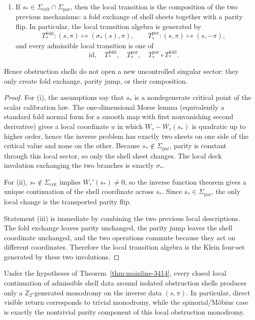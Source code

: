 \begin{theorem}
\begin{enumerate}[label=(\roman*)]
  \item If $s_\ast\in \Sigma_{\mathrm{crit}}\cap\Sigma_{\mathrm{par}}$, then the local transition is the composition of the two previous mechanisms: a fold exchange of shell sheets together with a parity flip. In particular, the local transition algebra is generated by
  \[
    T_\ast^{\mathrm{fold}}:(s,\pi)\mapsto (\sigma_\ast(s),\pi),
    \qquad
    T_\ast^{\mathrm{par}}:(s,\pi)\mapsto (s,-\pi),
  \]
  and every admissible local transition is one of
  \[
    \mathrm{id},
    \quad
    T_\ast^{\mathrm{fold}},
    \quad
    T_\ast^{\mathrm{par}},
    \quad
    T_\ast^{\mathrm{par}}\circ T_\ast^{\mathrm{fold}}.
  \]
\end{enumerate}
Hence obstruction shells do not open a new uncontrolled singular sector: they only create fold exchange, parity jump, or their composition.
\end{theorem}

\begin{proof}
For (i), the assumptions say that $s_\ast$ is a nondegenerate critical point of the scalar calibration law. The one-dimensional Morse lemma (equivalently a standard fold normal form for a smooth map with first nonvanishing second derivative) gives a local coordinate $u$ in which $W_\tau-W_\tau(s_\ast)$ is quadratic up to higher order, hence the inverse problem has exactly two sheets on one side of the critical value and none on the other. Because $s_\ast\notin \Sigma_{\mathrm{par}}$, parity is constant through this local sector, so only the shell sheet changes. The local deck involution exchanging the two branches is exactly $\sigma_\ast$.

For (ii), $s_\ast\notin \Sigma_{\mathrm{crit}}$ implies $W_\tau'(s_\ast)\neq 0$, so the inverse function theorem gives a unique continuation of the shell coordinate across $s_\ast$. Since $s_\ast\in \Sigma_{\mathrm{par}}$, the only local change is the transported parity flip.

Statement (iii) is immediate by combining the two previous local descriptions. The fold exchange leaves parity unchanged, the parity jump leaves the shell coordinate unchanged, and the two operations commute because they act on different coordinates. Therefore the local transition algebra is the Klein four-set generated by these two involutions.
\end{proof}

\begin{corollary}
\label{cor:mainline-3414}
Under the hypotheses of Theorem~\ref{thm:mainline-3414}, every closed local continuation of admissible shell data around isolated obstruction shells produces only a $\mathbb Z_2$-generated monodromy on the inverse data $(s,\pi)$. In particular, direct visible return corresponds to trivial monodromy, while the spinorial/M\"obius case is exactly the nontrivial parity component of this local obstruction monodromy.
\end{corollary}

